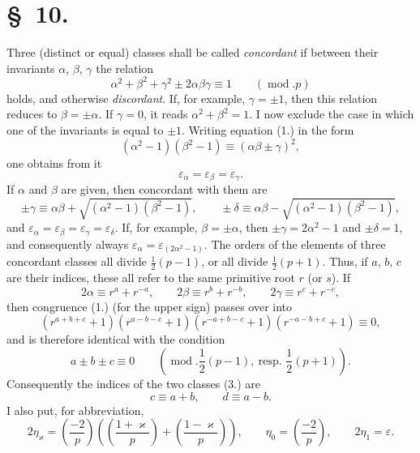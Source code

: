 \documentclass[11pt]{article}
\begin{document}
\section*{\S~10.}

Three (distinct or equal) classes shall be called \emph{concordant} if between their invariants $\alpha$, $\beta$, $\gamma$ the relation
\begin{equation*}\tag{1.}
\alpha^2+\beta^2+\gamma^2\pm2\alpha\beta\gamma\equiv1\qquad(\operatorname{mod}.p)
\end{equation*}
holds, and otherwise \emph{discordant}. If, for example, $\gamma=\pm1$, then this relation reduces to $\beta=\pm\alpha$. If $\gamma=0$, it reads $\alpha^2+\beta^2=1$. I now exclude the case in which one of the invariants is equal to $\pm1$. Writing equation (1.) in the form
\[
(\alpha^2-1)(\beta^2-1)\equiv(\alpha\beta\pm\gamma)^2,
\]
one obtains from it
\begin{equation*}\tag{2.}
\varepsilon_\alpha=\varepsilon_\beta=\varepsilon_\gamma.
\end{equation*}
If $\alpha$ and $\beta$ are given, then concordant with them are
\begin{equation*}\tag{3.}
\pm\gamma\equiv\alpha\beta+\sqrt{(\alpha^2-1)(\beta^2-1)},\qquad
\pm\delta\equiv\alpha\beta-\sqrt{(\alpha^2-1)(\beta^2-1)},
\end{equation*}
and $\varepsilon_\alpha=\varepsilon_\beta=\varepsilon_\gamma=\varepsilon_\delta$. If, for example, $\beta=\pm\alpha$, then $\pm\gamma=2\alpha^2-1$ and $\pm\delta=1$, and consequently always $\varepsilon_\alpha=\varepsilon_{(2\alpha^2-1)}$. The orders of the elements of three concordant classes all divide $\frac12(p-1)$, or all divide $\frac12(p+1)$. Thus, if $a$, $b$, $c$ are their indices, these all refer to the same primitive root $r$ (or $s$). If
\[
2\alpha\equiv r^a+r^{-a},\qquad
2\beta\equiv r^b+r^{-b},\qquad
2\gamma\equiv r^c+r^{-c},
\]
then congruence (1.) (for the upper sign) passes over into
\[
(r^{a+b+c}+1)(r^{a-b-c}+1)(r^{-a+b-c}+1)(r^{-a-b+c}+1)\equiv0,
\]
and is therefore identical with the condition
\begin{equation*}\tag{4.}
a\pm b\pm c\equiv0\qquad\left(\operatorname{mod}.\frac12(p-1),\ \text{resp. }\frac12(p+1)\right).
\end{equation*}
Consequently the indices of the two classes (3.) are
\begin{equation*}\tag{5.}
c\equiv a+b,\qquad d\equiv a-b.
\end{equation*}
I also put, for abbreviation,
\begin{equation*}\tag{6.}
2\eta_\varkappa=
\left(\frac{-2}{p}\right)
\left(\left(\frac{1+\varkappa}{p}\right)+\left(\frac{1-\varkappa}{p}\right)\right),
\qquad
\eta_0=\left(\frac{-2}{p}\right),\qquad
2\eta_1=\varepsilon.
\end{equation*}
\end{document}
